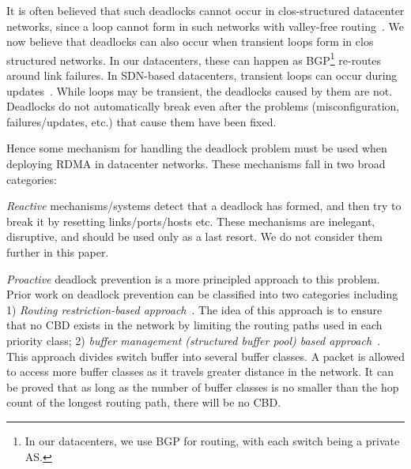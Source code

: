 It is often believed that such deadlocks cannot occur in clos-structured
datacenter networks, since a loop cannot form in such networks with valley-free
routing~\cite{dcqcn}.   We now believe that deadlocks
can also occur when transient loops form in clos structured networks. In our
datacenters, these can happen as BGP\footnote{In our datacenters, we use BGP for
routing, with each switch being a private AS.} re-routes around link failures.
In SDN-based datacenters, transient loops can occur during
updates~\cite{dionysus}. While loops may be transient, the deadlocks caused by
them are not. Deadlocks do not automatically break even after the problems
(misconfiguration, failures/updates, etc.) that cause them have been fixed.

Hence some mechanism for handling the deadlock problem must be used when
deploying RDMA in datacenter networks.  These mechanisms fall in two broad
categories: 

{\em Reactive} mechanisms/systems detect that a deadlock has formed, and then
try to break it by resetting links/ports/hosts etc.  These mechanisms are
inelegant, disruptive, and should be used only as a last resort.  We do not
consider them further in this paper.  

{\em Proactive} deadlock prevention is a more principled approach to this
problem. Prior work on deadlock prevention can be classified into two
categories including 1) \textit{Routing restriction-based
approach}~\cite{tcpbolt,flich2012survey}. The idea of this approach is to ensure
that no CBD exists in the network by limiting the routing
paths used in each priority class;  2) \textit{buffer management (structured
buffer pool) based approach}~\cite{gerla1980flow,karol2003prevention}. This
approach divides switch buffer into several buffer classes. A packet is allowed
to access more buffer classes as it travels greater distance in the network. It
can be proved that as long as the number of buffer classes is no smaller than
the hop count of the longest routing path, there will be no CBD.


